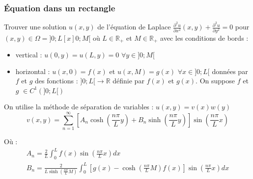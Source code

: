 \documentclass[../main.tex]{subfiles}
\begin{document}
\subsubsection{Équation dans un rectangle}
Trouver une solution $u(x,y)$ de l'équation de Laplace $\frac{\partial^2 u}{\partial x^2}(x,y) + \frac{\partial^2 u}{\partial y^2} = 0$ pour $(x,y) \in \Omega = ]0;L[x]0;M[$ où $L \in \mathbb{R}_+$ et $M \in \mathbb{R}_+$ avec les conditions de bords : \begin{itemize}
    \item vertical : $u(0,y) = u(L,y) = 0$ $\forall y \in ]0;M[$\\
    \item horizontal : $u(x,0) = f(x)$ et $u(x,M) = g(x)$ $\forall x \in ]0;L[$ données par $f$ et $g$ des fonctions : $]0;L[ \rightarrow \mathbb{R}$ définie par $f(x)$ et $g(x)$. On suppose $f$ et $g$ $\in C^1(]0;L[)$\\
\end{itemize}
On utilise la méthode de séparation de variables : $u(x,y) = v(x) w(y)$\\
\begin{equation}
    v(x,y) = \sum_{n=1}^\infty [A_n \cosh{(\frac{n\pi}{L}y)} + B_n \sinh{(\frac{n\pi}{L}y)}] \sin{(\frac{n\pi}{L}x)}
\end{equation}

Où : \begin{equation}
    \begin{gathered}
        A_n = \frac{2}{L} \int_0^L f(x) \sin{(\frac{n\pi}{L}x)}dx\\
        B_n = \frac{2}{L\sinh{(\frac{n\pi}{L}M)}} \int_0^L [g(x) - \cosh{(\frac{n\pi}{L}M)}f(x)]\sin{(\frac{n\pi}{L}x)}dx
    \end{gathered}
\end{equation}
\end{document}

